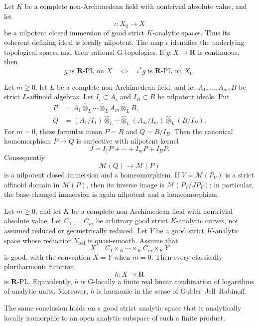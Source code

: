
\begin{lemma}
\label{lem:p061-nilpotent-rpl-invariance}
Let \(K\) be a complete non-Archimedean field with nontrivial absolute
value, and let
\[
                         \iota:X_0\longrightarrow X
\]
be a nilpotent closed immersion of good strict \(K\)-analytic spaces.  Thus
its coherent defining ideal is locally nilpotent.  The map \(\iota\)
identifies the underlying topological spaces and their rational
G-topologies.  If \(g:X\to\mathbf R\) is continuous, then
\[
 g\text{ is }\mathbf R\text{-PL on }X
 \quad\Longleftrightarrow\quad
 \iota^*g\text{ is }\mathbf R\text{-PL on }X_0.
\]
\end{lemma}

\begin{lemma}
\label{lem:p061-product-factor-reduction}
Let \(m\geq0\), let \(L\) be a complete non-Archimedean field, and let
\(A_1,\ldots,A_m,B\) be strict \(L\)-affinoid algebras.  Let
\(I_i\subset A_i\) and \(I_B\subset B\) be nilpotent ideals.  Put
\[
\begin{aligned}
 P&=A_1\widehat\otimes_L\cdots\widehat\otimes_LA_m
       \widehat\otimes_LB,\\
 Q&=(A_1/I_1)\widehat\otimes_L\cdots
       \widehat\otimes_L(A_m/I_m)\widehat\otimes_L(B/I_B).
\end{aligned}
\]
For \(m=0\), these formulas mean \(P=B\) and \(Q=B/I_B\).
Then the canonical homomorphism \(P\to Q\) is surjective with nilpotent
kernel
\[
                         J=I_1P+\cdots+I_mP+I_BP.
\]
Consequently
\[
                         \mathcal M(Q)\longrightarrow\mathcal M(P)
\]
is a nilpotent closed immersion and a homeomorphism.  If
\(V=\mathcal M(P_V)\) is a strict affinoid domain in \(\mathcal M(P)\),
then its inverse image is
\(\mathcal M(P_V/JP_V)\); in particular, the base-changed immersion is
again nilpotent and a homeomorphism.
\end{lemma}

\begin{theorem}
\label{thm:p061-arbitrary-curve-factors-ph-rpl}
Let \(m\geq0\), and let \(K\) be a complete non-Archimedean field with
nontrivial absolute value.  Let \(C_1,\ldots,C_m\) be arbitrary good
strict \(K\)-analytic
curves, not assumed reduced or geometrically reduced.  Let \(Y\) be a
good strict \(K\)-analytic space whose reduction
\(Y_{\mathrm{red}}\) is quasi-smooth.  Assume that
\[
              X=C_1\times_K\cdots\times_KC_m\times_KY
\]
is good, with the convention \(X=Y\) when \(m=0\).  Then every
classically pluriharmonic function
\[
                              h:X\longrightarrow\mathbf R
\]
is \(\mathbf R\)-PL.  Equivalently, \(h\) is G-locally a finite real
linear combination of logarithms of analytic units.  Moreover, \(h\) is
harmonic in the sense of Gubler--Jell--Rabinoff.

The same conclusion holds on a good strict analytic space that is
analytically locally isomorphic to an open analytic subspace of such a
finite product.
\end{theorem}

